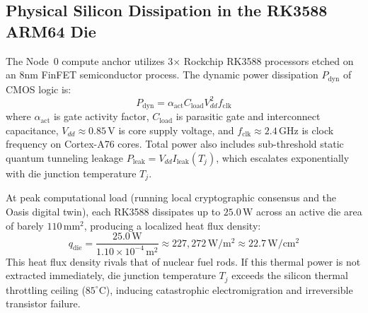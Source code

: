 \subsection{Physical Silicon Dissipation in the RK3588 ARM64 Die}
The Node~0 compute anchor utilizes 3$\times$ Rockchip RK3588 processors etched on an 8nm FinFET semiconductor process. The dynamic power dissipation $P_{\mathrm{dyn}}$ of CMOS logic is:
\begin{equation}
P_{\mathrm{dyn}} = \alpha_{\mathrm{act}} C_{\mathrm{load}} V_{dd}^2 f_{\mathrm{clk}}
\label{eq:cmos_dynamic_power}
\end{equation}
where $\alpha_{\mathrm{act}}$ is gate activity factor, $C_{\mathrm{load}}$ is parasitic gate and interconnect capacitance, $V_{dd} \approx 0.85\,\mathrm{V}$ is core supply voltage, and $f_{\mathrm{clk}} \approx 2.4\,\mathrm{GHz}$ is clock frequency on Cortex-A76 cores. Total power also includes sub-threshold static quantum tunneling leakage $P_{\mathrm{leak}} = V_{dd} I_{\mathrm{leak}}(T_j)$, which escalates exponentially with die junction temperature $T_j$.

At peak computational load (running local cryptographic consensus and the Oasis digital twin), each RK3588 dissipates up to $25.0\,\mathrm{W}$ across an active die area of barely $110\,\mathrm{mm^2}$, producing a localized heat flux density:
\begin{equation}
q_{\mathrm{die}} = \frac{25.0\,\mathrm{W}}{1.10 \times 10^{-4}\,\mathrm{m^2}} \approx 227,272\,\mathrm{W/m^2} \approx 22.7\,\mathrm{W/cm^2}
\label{eq:die_heat_flux}
\end{equation}
This heat flux density rivals that of nuclear fuel rods. If this thermal power is not extracted immediately, die junction temperature $T_j$ exceeds the silicon thermal throttling ceiling ($85^\circ\mathrm{C}$), inducing catastrophic electromigration and irreversible transistor failure.

